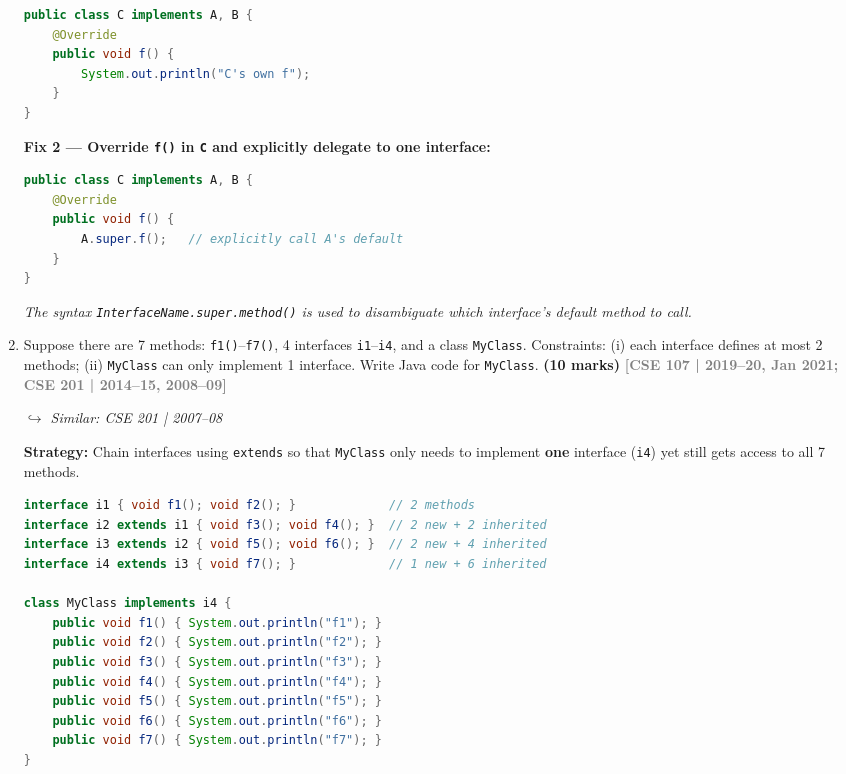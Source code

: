 \documentclass[12pt,a3paper]{article}
\newcommand{\yr}[1]{\hfill\textcolor{gray}{\small\textbf{[#1]}}}
\newcommand{\mk}[1]{\textcolor{orange!70!black}{\small\textbf{(#1 marks)}}}
\newcommand{\variant}[1]{\par\vspace{1pt}\textcolor{blue!50!black}%
  {\footnotesize\textit{$\hookrightarrow$ Similar: #1}}}
\begin{document}
\begin{enumerate}
\begin{tcolorbox}[enhanced,breakable,ansbox,
  colback=cD!4,colframe=cD,boxrule=0.8pt,arc=5pt,
  title={\textbf{Answer --- Default Method Conflict: Two Fixes}},
  fonttitle=\bfseries\color{white},colbacktitle=cD]
\begin{lstlisting}[language=Java]
public class C implements A, B {
    @Override
    public void f() {
        System.out.println("C's own f");
    }
}
\end{lstlisting}

\medskip
\textbf{Fix 2 --- Override \texttt{f()} in \texttt{C} and explicitly delegate to one interface:}

\begin{lstlisting}[language=Java]
public class C implements A, B {
    @Override
    public void f() {
        A.super.f();   // explicitly call A's default
    }
}
\end{lstlisting}

\textit{The syntax \texttt{InterfaceName.super.method()} is used to
disambiguate which interface's default method to call.}

\end{tcolorbox}

\item Suppose there are 7 methods: \texttt{f1()}--\texttt{f7()}, 4 interfaces \texttt{i1}--\texttt{i4}, and a class \texttt{MyClass}. Constraints: (i) each interface defines at most 2 methods; (ii) \texttt{MyClass} can only implement 1 interface. Write Java code for \texttt{MyClass}. \mk{10}
\yr{CSE 107 | 2019--20, Jan 2021; CSE 201 | 2014--15, 2008--09}
\variant{CSE 201 | 2007--08}

\begin{tcolorbox}[enhanced,breakable,ansbox,
  colback=cD!4,colframe=cD,boxrule=0.8pt,arc=5pt,
  title={\textbf{Answer --- 7 Methods, 4 Interfaces, \texttt{MyClass} Implements 1}},
  fonttitle=\bfseries\color{white},colbacktitle=cD]

\textbf{Strategy:} Chain interfaces using \texttt{extends} so that
\texttt{MyClass} only needs to implement \textbf{one} interface
(\texttt{i4}) yet still gets access to all 7 methods.

\begin{lstlisting}[language=Java]
interface i1 { void f1(); void f2(); }             // 2 methods
interface i2 extends i1 { void f3(); void f4(); }  // 2 new + 2 inherited
interface i3 extends i2 { void f5(); void f6(); }  // 2 new + 4 inherited
interface i4 extends i3 { void f7(); }             // 1 new + 6 inherited

class MyClass implements i4 {
    public void f1() { System.out.println("f1"); }
    public void f2() { System.out.println("f2"); }
    public void f3() { System.out.println("f3"); }
    public void f4() { System.out.println("f4"); }
    public void f5() { System.out.println("f5"); }
    public void f6() { System.out.println("f6"); }
    public void f7() { System.out.println("f7"); }
}
\end{lstlisting}


\end{tcolorbox}
\end{enumerate}
\end{document}
